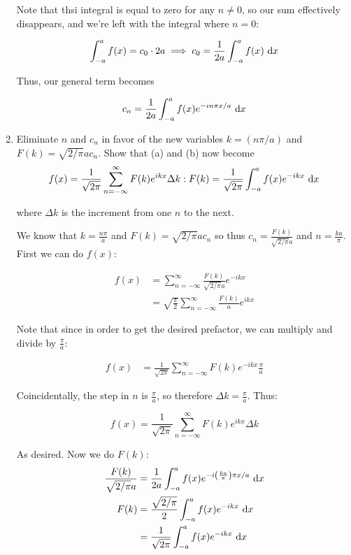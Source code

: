 \documentclass{article}
\begin{document}
\begin{enumerate}[label=(\alph*)]
\begin{solution}
        Note that thsi integral is equal to zero for any $n \neq 0$, so our sum effectively disappears, and we're left with the integral where $n = 0$:

        \[ \int_{-a}^a f(x) = c_0 \cdot 2a \implies c_0 = \frac{1}{2a}\int_{-a}^a f(x) \ \mathrm d x\]

        Thus, our general term becomes

        \[ c_n = \frac{1}{2a}\int_{-a}^a f(x) e^{-in \pi x/a} \ \mathrm d x\]



    \end{solution}

    


    \item Eliminate $n$ and $c_n$ in favor of the new variables $k = (n\pi / a)$ and $F(k) = \sqrt{2/\pi}a c_n$. Show that (a) and (b) now become
    \[ f(x) = \frac{1}{\sqrt{2\pi}}\sum_{n = -\infty}^\infty F(k)e^{ikx}\Delta k: F(k) = \frac{1}{\sqrt{2\pi}}\int_{-a}^a f(x) e^{-ikx} \ \mathrm d x\]

    where $\Delta k$ is the increment from one $n$ to the next. 

    \begin{solution}
        We know that $k = \frac{n\pi}{a}$ and $F(k) = \sqrt{2/\pi} ac_n$ so thus $c_n = \frac{F(k)}{\sqrt{2/\pi}a}$ and $n = \frac{ka}{\pi}$. First we can do $f(x)$: 


        \begin{align*}
            f(x) &= \sum_{n = -\infty}^\infty \frac{F(k)}{\sqrt{2/\pi} a} e^{-ikx}\\
            &= \sqrt{\frac{\pi}{2}} \sum_{n = -\infty}^\infty \frac{F(k)}{a} e^{ikx}
        \end{align*}

        Note that since in order to get the desired prefactor, we can multiply and divide by $\frac{\pi}{a}$:

        \begin{align*}
            f(x) &= \frac{1}{\sqrt{2\pi}} \sum_{n = -\infty}^\infty F(k) e^{-ikx} \frac{\pi}{a}
        \end{align*}

        Coincidentally, the step in $n$ is $\frac{\pi}{a}$, so therefore $\Delta k = \frac{\pi}{a}$. Thus:


        \[ f(x) = \frac{1}{\sqrt{2\pi}} \sum_{n = -\infty}^\infty F(k)e^{ikx} \Delta k\]

        As desired. Now we do $F(k)$:
        \begin{align*}
            \frac{F(k)}{\sqrt{2/\pi}a} &= \frac{1}{2a}\int_{-a}^a f(x) e^{-i\left(\frac{ka}{\pi}\right) \pi x/a} \ \mathrm d x\\
            F(k) &= \frac{\sqrt{2/\pi}}{2} \int_{-a}^a f(x) e^{-ikx} \ \mathrm d x\\
            &= \frac{1}{\sqrt{2\pi}} \int_{-a}^a f(x) e^{-ikx} \ \mathrm d x
        \end{align*}



\end{solution}
\end{enumerate}
\end{document}
